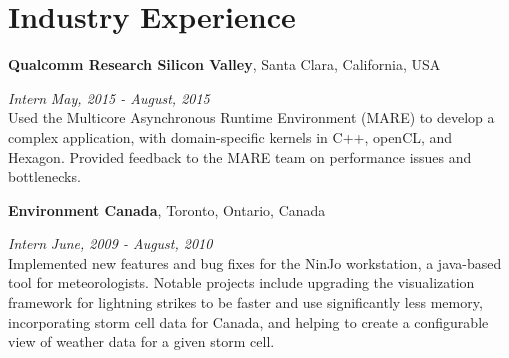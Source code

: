\section{\sc Industry Experience}

{\bf Qualcomm Research Silicon Valley}, Santa Clara, California, USA
\vspace{-.3cm}


{\em Intern} \hfill {\em May, 2015 - August, 2015}\\
Used the Multicore Asynchronous Runtime Environment (MARE) to develop a complex application, with domain-specific kernels in C++, openCL, and Hexagon.
Provided feedback to the MARE team on performance issues and bottlenecks.

{\bf Environment Canada}, Toronto, Ontario, Canada
\vspace{-.3cm}


{\em Intern} \hfill {\em June, 2009 - August, 2010}\\
Implemented new features and bug fixes for the NinJo workstation, a java-based tool for meteorologists.
Notable projects include upgrading the visualization framework for lightning strikes to be faster and use significantly less memory,
incorporating storm cell data for Canada,
and helping to create a configurable view of weather data for a given storm cell.
